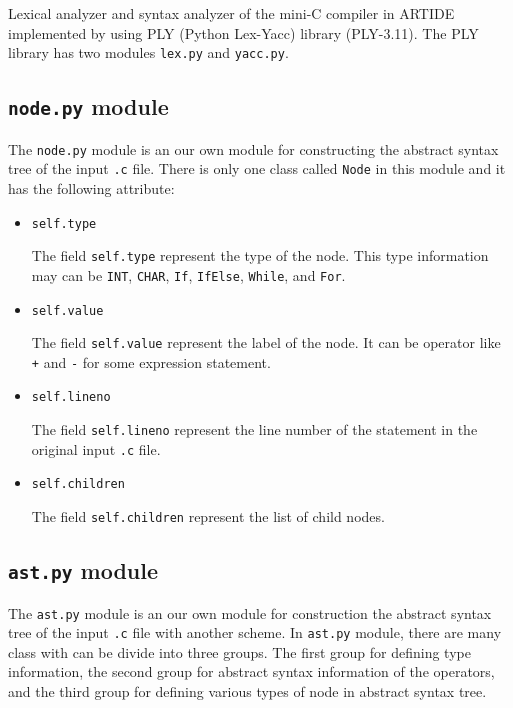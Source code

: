 \documentclass{article}
\newcommand{\code}[1]{\texttt{#1}}
\begin{document}
	Lexical analyzer and syntax analyzer of the mini-C compiler in ARTIDE implemented by using PLY (Python Lex-Yacc) library (PLY-3.11). The PLY library has two modules \code{lex.py} and \code{yacc.py}.
	
	\subsection{\code{node.py} module}
	
	The \code{node.py} module is an our own module for constructing the abstract syntax tree of the input \code{.c} file. There is only one class called \code{Node} in this module and it has the following attribute:
	
	\begin{itemize}
		\item \code{self.type}
		
		The field \code{self.type} represent the type of the node. This type information may can be \code{INT}, \code{CHAR}, \code{If}, \code{IfElse}, \code{While}, and \code{For}.
		
		\item \code{self.value}
		
		The field \code{self.value} represent the label of the node. It can be operator like \code{+} and \code{-} for some expression statement.
		
		\item \code{self.lineno}
		
		The field \code{self.lineno} represent the line number of the statement in the original input \code{.c} file.
		
		\item \code{self.children}
		
		The field \code{self.children} represent the list of child nodes.
	\end{itemize}
	
	\subsection{\code{ast.py} module}
	
	The \code{ast.py} module is an our own module for construction the abstract syntax tree of the input \code{.c} file with another scheme. In \code{ast.py} module, there are many class with can be divide into three groups. The first group for defining type information, the second group for abstract syntax information of the operators, and the third group for defining various types of node in abstract syntax tree.
	
\end{document}
